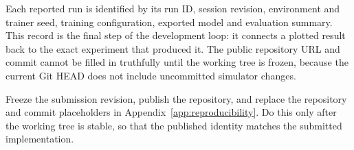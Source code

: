 Each reported run is identified by its run ID, session revision, environment and trainer seed,
training configuration, exported model and evaluation summary. This record is the final step of
the development loop: it connects a plotted result back to the exact experiment that produced
it. The public repository URL and commit cannot be filled in truthfully until the working tree
is frozen, because the current Git HEAD does not include uncommitted simulator changes.

\begin{thesistodo}
  Freeze the submission revision, publish the repository, and replace the repository and commit
  placeholders in Appendix~\ref{app:reproducibility}. Do this only after the working tree is
  stable, so that the published identity matches the submitted implementation.
\end{thesistodo}
